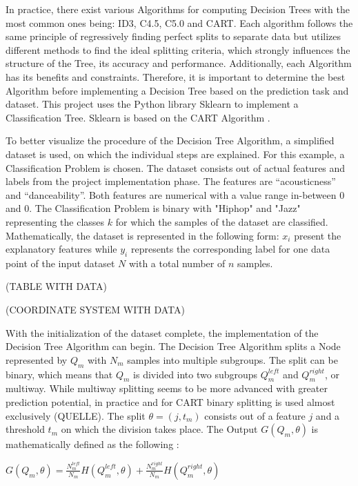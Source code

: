 In practice, there exist various Algorithms for computing Decision Trees with the most common ones 
being: ID3, C4.5, C5.0 and CART. Each algorithm follows the same principle of regressively finding 
perfect splits to separate data but utilizes different methods to find the ideal splitting 
criteria, which strongly influences the structure of the Tree, its accuracy and performance. 
Additionally, each Algorithm has its benefits and constraints. Therefore, it is important to 
determine the best Algorithm before implementing a Decision Tree based on the prediction task 
and dataset. This project uses the Python library Sklearn to implement a Classification Tree. 
Sklearn is based on the CART Algorithm \cite[10.10.6]{sklearn Decision Trees}.

To better visualize the procedure of the Decision Tree Algorithm, a simplified dataset is used, 
on which the individual steps are explained. For this example, a Classification Problem is chosen. 
The dataset consists out of actual features and labels from the project implementation phase. The 
features are “acousticness” and “danceability”. Both features are numerical with a value range 
in-between \(0\) and \(0\). The Classification Problem is binary with "Hiphop" and "Jazz" representing 
the classes \(k\) for which the samples of the dataset are classified. Mathematically, the dataset 
is represented in the following form: \(x_{i}\) present the explanatory features while \(y_{i}\) represents 
the corresponding label for one data point of the input dataset \(N\) with a total number of \(n\) 
samples.

(TABLE WITH DATA)

(COORDINATE SYSTEM WITH DATA)

With the initialization of the dataset complete, the implementation of the Decision Tree 
Algorithm can begin. The Decision Tree Algorithm splits a Node represented by \(Q_{m}\) with \(N_{m}\) samples 
into multiple subgroups. The split can be binary, which means that \(Q_{m}\) is divided into two 
subgroups \(Q^{left}_{m}\) and \(Q^{right}_{m}\), or multiway. While multiway splitting seems to be more advanced 
with greater prediction potential, in practice and for CART binary splitting is used almost 
exclusively (QUELLE). The split \(\theta = (j, t_{m})\) consists out of a feature \(j\) and a threshold \(t_{m}\) on which the 
division takes place. The Output \(G(Q_{m},\theta)\) is mathematically defined as the following \cite[10.10.7]{sklearn Decision Trees}: 

\(G(Q_{m},\theta) = \frac{N^{left}_{m}}{N_{m}} H(Q^{left}_{m}, \theta ) + \frac{N^{right}_{m}}{N_{m}} H(Q^{right}_{m}, \theta ) \)


